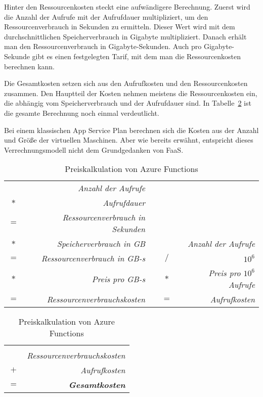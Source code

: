 Hinter den Ressourcenkosten steckt eine aufwändigere Berechnung. Zuerst wird die Anzahl der Aufrufe mit der Aufrufdauer multipliziert, um den Ressourcenverbrauch in Sekunden zu ermitteln. Dieser Wert wird mit dem durchschnittlichen Speicherverbrauch in Gigabyte multipliziert. Danach erhält man den Ressourcenverbrauch in Gigabyte-Sekunden. Auch pro Gigabyte-Sekunde gibt es einen festgelegten Tarif, mit dem man die Ressourcenkosten berechnen kann.

Die Gesamtkosten setzen sich aus den Aufrufkosten und den Ressourcenkosten zusammen. Den Hauptteil der Kosten nehmen meistens die Ressourcenkosten ein, die abhängig vom Speicherverbrauch und der Aufrufdauer sind. In Tabelle~\ref{tab:azfun-pricing} ist die gesamte Berechnung noch einmal verdeutlicht.

Bei einem klassischen App Service Plan berechnen sich die Kosten aus der Anzahl und Größe der virtuellen Maschinen. Aber wie bereits erwähnt, entspricht dieses Verrechnungsmodell nicht dem Grundgedanken von FaaS.

\begin{table}[!hbt]
\caption{Preiskalkulation von Azure Functions}
\label{tab:azfun-pricing}
\centering

\begin{tabular}{crccr}
& \textit{Anzahl der Aufrufe} & & & \\
$*$ & \textit{Aufrufdauer} & & & \\
\cline{1-2}
$=$ & \textit{Ressourcenverbrauch in Sekunden} & & & \\
$*$ & \textit{Speicherverbrauch in GB} & & & \textit{Anzahl der Aufrufe} \\
\cline{1-2}
$=$ & \textit{Ressourcenverbrauch in GB-s} & & $/$ & $10^6$ \\
$*$ & \textit{Preis pro GB-s} & & $*$ & \textit{Preis pro $10^6$ Aufrufe} \\
\cline{1-2}\cline{4-5}
$=$ & \textit{Ressourcenverbrauchskosten} & & $=$ & \textit{Aufrufkosten} \\
\end{tabular}

\begin{tabular}{cr}
 & \\
& \textit{Ressourcenverbrauchskosten} \\
$+$ & \textit{Aufrufkosten} \\
\hline
$=$ & \textit{\textbf{Gesamtkosten}} \\
\hline\hline
\end{tabular}

\end{table}

